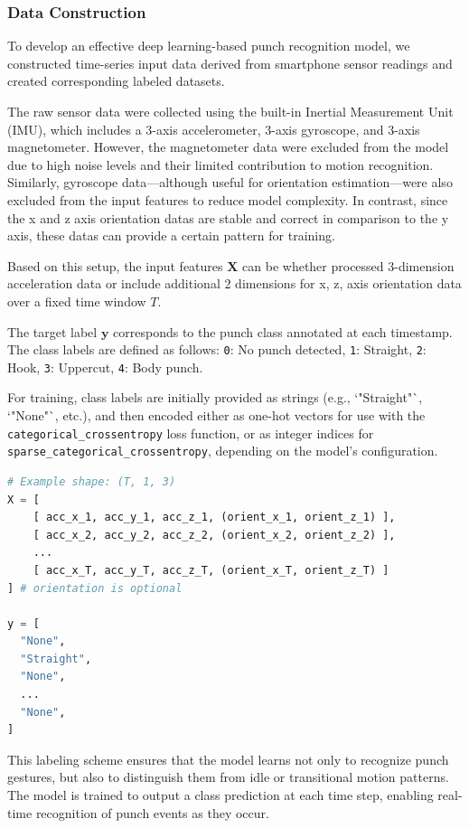 \documentclass{article}
\begin{document}
    \subsubsection{Data Construction}

    To develop an effective deep learning-based punch recognition model, we constructed
    time-series input data derived from smartphone sensor readings and created corresponding
    labeled datasets.

    The raw sensor data were collected using the built-in Inertial Measurement Unit
    (IMU), which includes a 3-axis accelerometer, 3-axis gyroscope, and 3-axis
    magnetometer. However, the magnetometer data were excluded from the model
    due to high noise levels and their limited contribution to motion
    recognition. Similarly, gyroscope data—although useful for orientation
    estimation—were also excluded from the input features to reduce model
    complexity. In contrast, since the x and z axis orientation datas are stable
    and correct in comparison to the y axis, these datas can provide a certain pattern
    for training.

    Based on this setup, the input features $\mathbf{X}$ can be whether
    processed 3-dimension acceleration data or include additional 2 dimensions
    for x, z, axis orientation data over a fixed time window $T$.

    The target label $\mathbf{y}$ corresponds to the punch class annotated at
    each timestamp. The class labels are defined as follows: \texttt{0}: No
    punch detected, \texttt{1}: Straight, \texttt{2}: Hook, \texttt{3}: Uppercut,
    \texttt{4}: Body punch.

    For training, class labels are initially provided as strings (e.g., `"Straight"`,
    `"None"`, etc.), and then encoded either as one-hot vectors for use with the
    \texttt{categorical\_crossentropy} loss function, or as integer indices for \texttt{sparse\_categorical\_crossentropy},
    depending on the model's configuration.

    \begin{lstlisting}[language=Python, caption={Example input-output data format}]
# Example shape: (T, 1, 3)
X = [
    [ acc_x_1, acc_y_1, acc_z_1, (orient_x_1, orient_z_1) ], 
    [ acc_x_2, acc_y_2, acc_z_2, (orient_x_2, orient_z_2) ],
    ...
    [ acc_x_T, acc_y_T, acc_z_T, (orient_x_T, orient_z_T) ]
] # orientation is optional

y = [
  "None",
  "Straight",
  "None",
  ...
  "None",
]
\end{lstlisting}
    This labeling scheme ensures that the model learns not only to recognize punch
    gestures, but also to distinguish them from idle or transitional motion
    patterns. The model is trained to output a class prediction at each time step,
    enabling real-time recognition of punch events as they occur.
\end{document}
